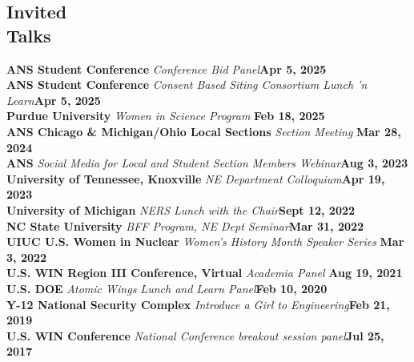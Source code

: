 \documentclass[margin,line]{resume}
\begin{document}
\begin{resume}
    \section{\mysidestyle Invited\\Talks}
    \textbf{ANS Student Conference} \textsl{Conference Bid Panel}\hfill \textbf{Apr 5, 2025}\\
    \textbf{ANS Student Conference} \textsl{Consent Based Siting Consortium Lunch 'n Learn}\hfill \textbf{Apr 5, 2025}\\
    \textbf{Purdue University} \textsl{Women in Science Program} \hfill \textbf{Feb 18, 2025}\\ 
    \textbf{ANS Chicago \& Michigan/Ohio Local Sections} \textsl{Section Meeting} \hfill\textbf{Mar 28, 2024}\\
    \textbf{ANS} \textsl{Social Media for Local and Student Section Members Webinar}\hfill \textbf{Aug 3, 2023}\\
    \textbf{University of Tennessee, Knoxville} \textsl{NE Department Colloquium}\hfill \textbf{Apr 19, 2023}\\
    \textbf{University of Michigan} \textsl{NERS Lunch with the Chair}\hfill \textbf{Sept 12, 2022}\\
    \textbf{NC State University} \textsl{BFF Program, NE Dept Seminar}\hfill\textbf{Mar 31, 2022}\\
    \textbf{UIUC U.S. Women in Nuclear} \textsl{Women's History Month Speaker Series} \hfill\textbf{Mar 3, 2022}\\
    \textbf{U.S. WIN Region III Conference, Virtual} \textsl{Academia Panel} \hfill \textbf{Aug 19, 2021}\\
    \textbf{U.S. DOE} \textsl{Atomic Wings Lunch and Learn Panel}\hfill \textbf{Feb 10, 2020} \\
    \textbf{Y-12 National Security Complex} \textsl{Introduce a Girl to Engineering}\hfill \textbf{Feb 21, 2019} \\
    \textbf{U.S. WIN Conference} \textsl{National Conference breakout session panel}\hfill \textbf{Jul 25, 2017}
    

\end{resume}
\end{document}
